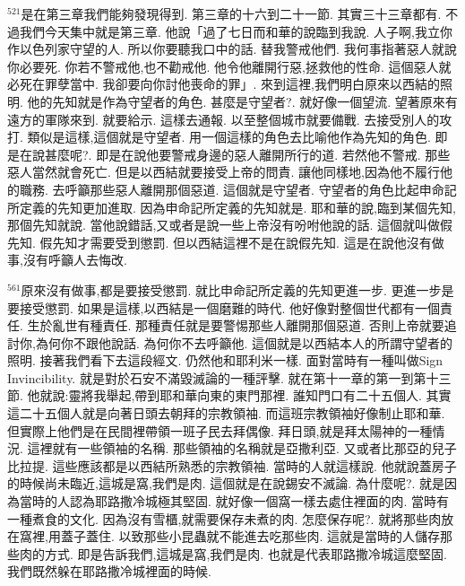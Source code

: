 \documentclass{book}
\begin{document}
$^{521}$是在第三章我們能夠發現得到.
第三章的十六到二十一節.
其實三十三章都有.
不過我們今天集中就是第三章.
他說「過了七日而和華的說臨到我說.
人子啊,我立你作以色列家守望的人.
所以你要聽我口中的話.
替我警戒他們.
我何事指著惡人就說你必要死.
你若不警戒他,也不勸戒他.
他令他離開行惡,拯救他的性命.
這個惡人就必死在罪孽當中.
我卻要向你討他喪命的罪」.
來到這裡,我們明白原來以西結的照明.
他的先知就是作為守望者的角色.
甚麼是守望者?.
就好像一個望流.
望著原來有遠方的軍隊來到.
就要給示.
這樣去通報.
以至整個城市就要備戰.
去接受別人的攻打.
類似是這樣,這個就是守望者.
用一個這樣的角色去比喻他作為先知的角色.
即是在說甚麼呢?.
即是在說他要警戒身邊的惡人離開所行的道.
若然他不警戒.
那些惡人當然就會死亡.
但是以西結就要接受上帝的問責.
讓他同樣地,因為他不履行他的職務.
去呼籲那些惡人離開那個惡道.
這個就是守望者.
守望者的角色比起申命記所定義的先知更加進取.
因為申命記所定義的先知就是.
耶和華的說,臨到某個先知,那個先知就說.
當他說錯話,又或者是說一些上帝沒有吩咐他說的話.
這個就叫做假先知.
假先知才需要受到懲罰.
但以西結這裡不是在說假先知.
這是在說他沒有做事,沒有呼籲人去悔改.

$^{561}$原來沒有做事,都是要接受懲罰.
就比申命記所定義的先知更進一步.
更進一步是要接受懲罰.
如果是這樣,以西結是一個磨難的時代.
他好像對整個世代都有一個責任.
生於亂世有種責任.
那種責任就是要警惕那些人離開那個惡道.
否則上帝就要追討你,為何你不跟他說話.
為何你不去呼籲他.
這個就是以西結本人的所謂守望者的照明.
接著我們看下去這段經文.
仍然他和耶利米一樣.
面對當時有一種叫做Sign Invincibility.
就是對於石安不滿毀滅論的一種評擊.
就在第十一章的第一到第十三節.
他就說:靈將我舉起,帶到耶和華向東的東門那裡.
誰知門口有二十五個人.
其實這二十五個人就是向著日頭去朝拜的宗教領袖.
而這班宗教領袖好像制止耶和華.
但實際上他們是在民間裡帶領一班子民去拜偶像.
拜日頭,就是拜太陽神的一種情況.
這裡就有一些領袖的名稱.
那些領袖的名稱就是亞撒利亞.
又或者比那亞的兒子比拉提.
這些應該都是以西結所熟悉的宗教領袖.
當時的人就這樣說.
他就說蓋房子的時候尚未臨近,這城是窩,我們是肉.
這個就是在說錫安不滅論.
為什麼呢?.
就是因為當時的人認為耶路撒冷城極其堅固.
就好像一個窩一樣去處住裡面的肉.
當時有一種煮食的文化.
因為沒有雪櫃,就需要保存未煮的肉.
怎麼保存呢?.
就將那些肉放在窩裡,用蓋子蓋住.
以致那些小昆蟲就不能進去吃那些肉.
這就是當時的人儲存那些肉的方式.
即是告訴我們,這城是窩,我們是肉.
也就是代表耶路撒冷城這麼堅固.
我們既然躲在耶路撒冷城裡面的時候.
\end{document}
